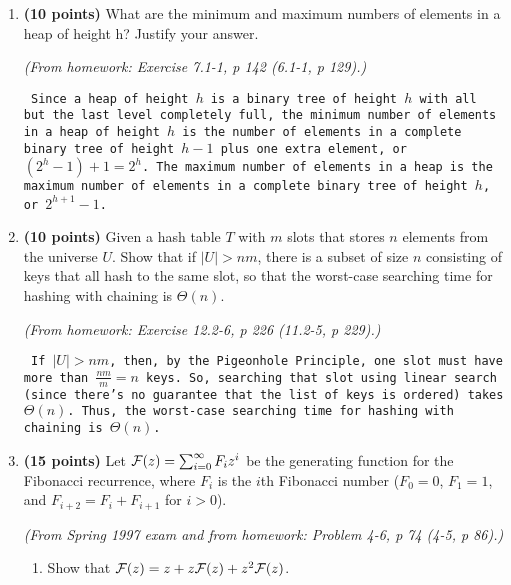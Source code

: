 \begin{enumerate}

    \item {\bf (10 points)}
	What are the minimum and maximum numbers of elements in a
	heap of height h?  Justify your answer.

	{\em (From homework: Exercise 7.1-1, p 142 (6.1-1, p 129).)}

{\tt
Since a heap of height $h$ is a binary tree of height $h$ with all
but the last level completely full, the minimum number of elements
in a heap of height $h$ is the number of elements in a complete 
binary tree of height $h-1$ plus one extra element, or $(2^h-1)+1 = 2^h$.
The maximum number of elements in a heap is the maximum number of 
elements in a complete binary tree of height $h$, or $2^{h+1}-1$. 
}

    \item {\bf (10 points)}
	Given a hash table $T$ with $m$ slots that stores $n$ elements
	from the universe $U$.
	Show that if $|U| > nm$, there is a subset of size $n$ consisting
	of keys that all hash to the same slot, so that the worst-case
	searching time for hashing with chaining is $\Theta(n)$.

	{\em (From homework: Exercise 12.2-6, p 226 (11.2-5, p 229).)}

{\tt
If $|U| > nm$, then, by the Pigeonhole Principle, one slot must have
more than $\frac{nm}{m} = n$ keys.  So, searching that slot using linear 
search (since there's no guarantee that the list of keys is ordered) 
takes $\Theta(n)$.  Thus, 
the worst-case searching time for hashing with chaining is $\Theta(n)$.
}

    \item {\bf (15 points)}
	Let ${\cal F}(z) = \sum_{i=0}^{\infty} F_i z^i$ be the 
	generating function for the Fibonacci recurrence, where
	$F_i$ is the $i$th Fibonacci number ($F_0 = 0$, $F_1 = 1$,
	and $F_{i+2} = F_{i} + F_{i+1}$ for $i>0$).

	{\em (From Spring 1997 exam and from homework: Problem 
	4-6, p 74 (4-5, p 86).)}

	\begin{enumerate}
	    \item Show that 
		${\cal F}(z) = z + z{\cal F}(z) + z^2 {\cal F}(z)$.


\end{enumerate}
\end{enumerate}
